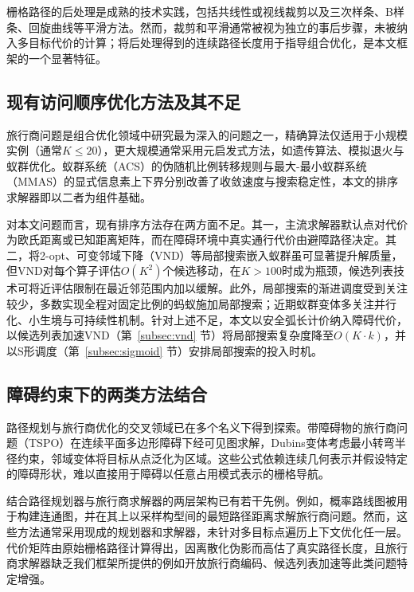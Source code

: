 \documentclass[lettersize,journal]{IEEEtran}
\begin{document}
栅格路径的后处理是成熟的技术实践，包括共线性或视线裁剪\textcolor{blue}{\cite{ref16}}以及三次样条、B样条、回旋曲线等平滑方法\textcolor{blue}{\cite{ref17,ref18}}。然而，裁剪和平滑通常被视为独立的事后步骤，未被纳入多目标代价的计算；将后处理得到的连续路径长度用于指导组合优化，是本文框架的一个显著特征。

\subsection{现有访问顺序优化方法及其不足}

旅行商问题是组合优化领域中研究最为深入的问题之一，精确算法仅适用于小规模实例（通常$K \leq 20$），更大规模通常采用元启发式方法，如遗传算法\textcolor{blue}{\cite{ref19}}、模拟退火\textcolor{blue}{\cite{ref20}}与蚁群优化\textcolor{blue}{\cite{ref21}}。蚁群系统（ACS）的伪随机比例转移规则\textcolor{blue}{\cite{ref22}}与最大-最小蚁群系统（MMAS）的显式信息素上下界\textcolor{blue}{\cite{ref23}}分别改善了收敛速度与搜索稳定性，本文的排序求解器即以二者为组件基础。

对本文问题而言，现有排序方法存在两方面不足。其一，主流求解器默认点对代价为欧氏距离或已知距离矩阵，而在障碍环境中真实通行代价由避障路径决定。其二，将2-opt、可变邻域下降（VND）等局部搜索嵌入蚁群虽可显著提升解质量\textcolor{blue}{\cite{ref24,ref25}}，但VND对每个算子评估$O(K^2)$个候选移动，在$K > 100$时成为瓶颈，候选列表技术可将近评估限制在最近邻范围内加以缓解\textcolor{blue}{\cite{ref26}}。此外，局部搜索的渐进调度受到关注较少，多数实现全程对固定比例的蚂蚁施加局部搜索；近期蚁群变体多关注并行化、小生境与可持续性机制\textcolor{blue}{\cite{ref27,ref28,ref29,ref30}}。针对上述不足，本文以安全弧长计价纳入障碍代价，以候选列表加速VND（第~\textcolor{blue}{\ref{subsec:vnd}} 节）将局部搜索复杂度降至$O(K \cdot k)$，并以S形调度（第~\textcolor{blue}{\ref{subsec:sigmoid}} 节）安排局部搜索的投入时机。

\subsection{障碍约束下的两类方法结合}

路径规划与旅行商优化的交叉领域已在多个名义下得到探索\textcolor{blue}{\cite{ref4}}。带障碍物的旅行商问题（TSPO）在连续平面多边形障碍下经可见图求解\textcolor{blue}{\cite{ref3}}，Dubins变体考虑最小转弯半径约束，邻域变体将目标从点泛化为区域。这些公式依赖连续几何表示并假设特定的障碍形状，难以直接用于障碍以任意占用模式表示的栅格导航。

结合路径规划器与旅行商求解器的两层架构已有若干先例\textcolor{blue}{\cite{ref1,ref2}}。例如，概率路线图被用于构建连通图，并在其上以采样构型间的最短路径距离求解旅行商问题。然而，这些方法通常采用现成的规划器和求解器，未针对多目标点遍历上下文优化任一层。代价矩阵由原始栅格路径计算得出，因离散化伪影而高估了真实路径长度，且旅行商求解器缺乏我们框架所提供的例如开放旅行商编码、候选列表加速等此类问题特定增强。
\end{document}
